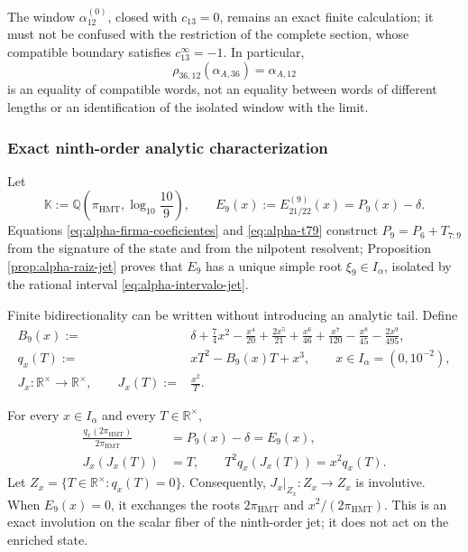 The window \(\alpha_{12}^{(0)}\), closed with \(c_{13}=0\), remains an exact
finite calculation; it must not be confused with the restriction of the
complete section, whose compatible boundary satisfies
\(c_{13}^{\infty}=-1\). In particular,
\begin{equation}
 \rho_{36,12}(\alpha_{A,36})=\alpha_{A,12}
 \label{eq:alpha-rho-36-12-proyectiva}
\end{equation}
is an equality of compatible words, not an equality between words of
different lengths or an identification of the isolated window with the
limit.

\subsubsection{Exact ninth-order analytic characterization}

Let
\[
 \mathbb K:=\mathbb Q\!\left(\pi_{\mathrm{HMT}},
                  \log_{10}\frac{10}{9}\right),
 \qquad
 E_9(x):=E_{21/22}^{(9)}(x)=P_9(x)-\delta .
\]
Equations \eqref{eq:alpha-firma-coeficientes} and
\eqref{eq:alpha-t79} construct \(P_9=P_6+T_{7:9}\) from the signature of the
state and from the nilpotent resolvent; Proposition
\ref{prop:alpha-raiz-jet} proves that \(E_9\) has a unique simple root
\(\xi_9\in I_\alpha\), isolated by the rational interval
\eqref{eq:alpha-intervalo-jet}.

Finite bidirectionality can be written without introducing an analytic tail.
Define
\begin{align}
 B_9(x):={}&\delta+\frac74x^2-\frac{x^4}{20}
 +\frac{2x^5}{21}+\frac{x^6}{46}+\frac{x^7}{120}
 -\frac{x^8}{45}-\frac{2x^9}{495},
 \label{eq:alpha-b9-finito}\\
 q_x(T):={}&xT^2-B_9(x)T+x^3,\qquad x\in I_\alpha=(0,10^{-2}),
 \label{eq:alpha-q-involucion-finita}\\
 J_x:{\mathbb R}^{\times}\longrightarrow{\mathbb R}^{\times},
 \qquad J_x(T):={}&\frac{x^2}{T}.
\end{align}

\begin{proposition}
\label{prop:alpha-involucion-finita-exacta}
For every \(x\in I_\alpha\) and every \(T\in\mathbb R^\times\),
\begin{align}
 \frac{q_x(2\pi_{\mathrm{HMT}})}{2\pi_{\mathrm{HMT}}}
 &=P_9(x)-\delta=E_9(x),
 \label{eq:alpha-q-equivale-p9}\\
 J_x(J_x(T))&=T,
 \qquad
 T^2q_x(J_x(T))=x^2q_x(T).
 \label{eq:alpha-j-involucion-exacta}
\end{align}
Let \(Z_x=\{T\in\mathbb R^\times:q_x(T)=0\}\). Consequently,
\(J_x|_{Z_x}:Z_x\to Z_x\) is involutive. When \(E_9(x)=0\), it exchanges
the roots \(2\pi_{\mathrm{HMT}}\) and
\(x^2/(2\pi_{\mathrm{HMT}})\). This is an exact involution on the scalar
fiber of the ninth-order jet; it does not act on the enriched state.
\end{proposition}

